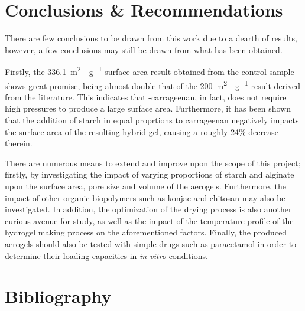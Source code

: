 \documentclass[a4paper,12pt]{article}
\begin{document}
\pagebreak

\section{Conclusions \& Recommendations}

There are few conclusions to be drawn from this work due to a dearth of results, however, a few conclusions may still be drawn from what has been obtained.

Firstly, the  \SI{336.1}{m^2\cdot g^{-1}} surface area result obtained from the control sample shows great promise, being almost double that of the \SI{200}{m^2\cdot g^{-1}} result derived from the literature. This indicates that \textkappa-carrageenan, in fact, does not require high pressures to produce a large surface area. Furthermore, it has been shown that the addition of starch in equal proprtions to carrageenan negatively impacts the surface area of the resulting hybrid gel, causing a roughly 24\% decrease therein.

There are numerous means to extend and improve upon the scope of this project; firstly, by investigating the impact of varying proportions of starch and alginate upon the surface area, pore size and volume of the aerogels. Furthermore, the impact of other organic biopolymers such as konjac and chitosan may also be investigated. In addition, the optimization of the drying process is also another curious avenue for study, as well as the impact of the temperature profile of the hydrogel making process on the aforementioned factors. Finally, the produced aerogels should also be tested with simple drugs such as paracetamol in order to determine their loading capacities in \textit{in vitro} conditions.

\pagebreak

\section{Bibliography}

\printbibliography[heading=none]
\end{document}
